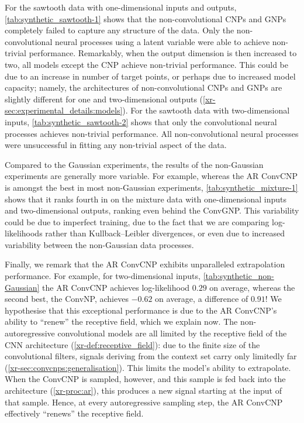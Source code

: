 \documentclass[12pt, twoside]{report}
\newcommand{\xrprefix}[1]{xr-#1}
\begin{document}
For the sawtooth data with one-dimensional inputs and outputs, \cref{tab:synthetic_sawtooth-1} shows that the non-convolutional CNPs and GNPs completely failed to capture any structure of the data.
Only the non-convolutional neural processes using a latent variable were able to achieve non-trivial performance.
Remarkably, when the output dimension is then increased to two, all models except the CNP achieve non-trivial performance.
This could be due to an increase in number of target points, or perhaps due to increased model capacity;
namely, the architectures of non-convolutional CNPs and GNPs are slightly different for one and two-dimensional outputs (\cref{\xrprefix{sec:experimental_details:models}}).
For the sawtooth data with two-dimensional inputs, \cref{tab:synthetic_sawtooth-2} shows that only the convolutional neural processes achieves non-trivial performance.
All non-convolutional neural processes were unsuccessful in fitting any non-trivial aspect of the data.

\afterpage{\FloatBarrier}

Compared to the Gaussian experiments, the results of the non-Gaussian experiments are generally more variable.
For example, whereas the AR ConvCNP is amongst the best in most non-Gaussian experiments,
\cref{tab:synthetic_mixture-1} shows that it ranks fourth in on the mixture data with one-dimensional inputs and two-dimensional outputs, ranking even behind the ConvGNP.
This variability could be due to imperfect training, due to the fact that we are comparing log-likelihoods rather than Kullback--Leibler divergences, or even due to increased variability between the non-Gaussian data processes.

Finally, we remark that the AR ConvCNP exhibits unparalleled extrapolation performance.
For example, for two-dimensional inputs, \cref{tab:synthetic_non-Gaussian} the AR ConvCNP achieves log-likelihood $0.29$ on average, whereas the second best, the ConvNP, achieves $-0.62$ on average, a difference of $0.91$!
We hypothesise that this exceptional performance is due to the AR ConvCNP's ability to ``renew'' the receptive field, which we explain now.
The non-autoregressive convolutional models are all limited by the receptive field of the CNN architecture (\cref{\xrprefix{def:receptive_field}}):
due to the finite size of the convolutional filters, signals deriving from the context set carry only limitedly far (\cref{\xrprefix{sec:convcnps:generalisation}}).
This limits the model's ability to extrapolate.
When the ConvCNP is sampled, however, and this sample is fed back into the architecture (\cref{\xrprefix{proc:ar}}), this produces a new signal starting at the input of that sample.
Hence, at every autoregressive sampling step, the AR ConvCNP effectively ``renews'' the receptive field.
\end{document}
